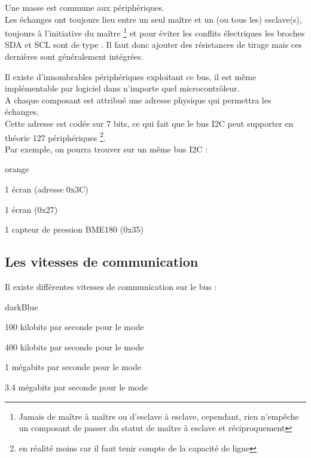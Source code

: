 Une masse est commune aux périphériques.\\

Les échanges ont toujours lieu entre un seul maître et un (ou tous les) esclave(s), toujours à l’initiative du maître \footnote{Jamais de maître à maître ou d’esclave à esclave, cependant, rien n’empêche un composant de passer du statut de maître à esclave et réciproquement} et pour éviter les conflits électriques les broches SDA et SCL sont de type . Il faut donc ajouter des résistances de tirage mais ces dernières sont généralement intégrées.


Il existe d’innombrables périphériques exploitant ce bus, il est même implémentable par logiciel dans n’importe quel microcontrôleur.\\

A chaque composant est attribué une adresse physique qui permettra les échanges.\\
 Cette adresse est codée sur 7 bits, ce qui fait que le bus I2C peut supporter en théorie 127 périphériques \footnote{en  réalité moins car il faut tenir compte de la capacité de ligne}.\\
Par exemple, on pourra trouver sur un même bus I2C : \\

\begin{items}{orange}{\Triangle}

    \item 1 écran   (adresse 0x3C) 
    \item 1 écran   (0x27) 
    \item 1 capteur de pression BME180 (0x35)
\end{items}




\subsection{Les vitesses de communication}

Il existe différentes vitesses de communication sur le bus : 

\begin{items}{darkBlue}{\Triangle}
\item 100 kilobits par seconde pour le mode 
\item 400 kilobits par seconde pour le mode 
\item 1 mégabits par seconde pour le mode 
\item 3.4 mégabits par seconde pour le mode 
\end{items}

